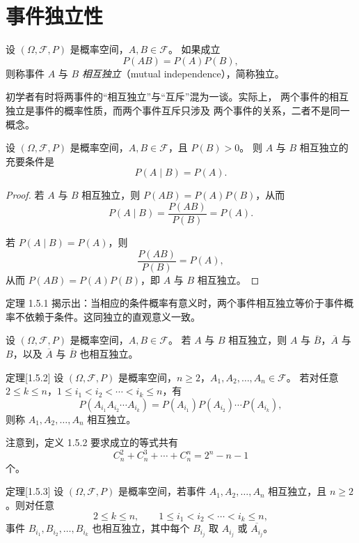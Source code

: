 \section{事件独立性}
\begin{definition}[独立的定义]
设 $(\Omega, \mathcal{F}, P)$ 是概率空间，$A,B \in \mathcal{F}$。
如果成立
\[
P(AB) = P(A) P(B),
\]
则称事件 $A$ 与 $B$ \emph{相互独立}（mutual independence），简称独立。

\medskip
初学者有时将两事件的“相互独立”与“互斥”混为一谈。实际上，
两个事件的相互独立是事件的概率性质，而两个事件互斥只涉及
两个事件的关系，二者不是同一概念。
\end{definition}
\begin{theorem}
设 $(\Omega, \mathcal{F}, P)$ 是概率空间，$A,B \in \mathcal{F}$，且 $P(B) > 0$。  
则 $A$ 与 $B$ 相互独立的充要条件是
\[
P(A \mid B) = P(A).
\]
\end{theorem}

\begin{proof}
若 $A$ 与 $B$ 相互独立，则 $P(AB) = P(A)P(B)$，从而
\[
P(A \mid B) = \frac{P(AB)}{P(B)} = P(A).
\]

若 $P(A \mid B) = P(A)$，则
\[
\frac{P(AB)}{P(B)} = P(A),
\]
从而 $P(AB) = P(A)P(B)$，即 $A$ 与 $B$ 相互独立。
\end{proof}

\noindent
定理 1.5.1 揭示出：当相应的条件概率有意义时，两个事件相互独立等价于事件概率不依赖于条件。这同独立的直观意义一致。
\begin{theorem}
设 $(\Omega, \mathcal{F}, P)$ 是概率空间，$A,B \in \mathcal{F}$。  
若 $A$ 与 $B$ 相互独立，则 $A$ 与 $\overline{B}$，$\overline{A}$ 与 $B$，以及 $\overline{A}$ 与 $\overline{B}$ 也相互独立。
\end{theorem}
\begin{definition}[独立事件同时发生概率就是他们概率直接乘]定理[1.5.2]
设 $(\Omega, \mathcal{F}, P)$ 是概率空间，$n \geq 2$，$A_1, A_2, \dots, A_n \in \mathcal{F}$。  
若对任意 $2 \leq k \leq n$，$1 \leq i_1 < i_2 < \cdots < i_k \leq n$，有
\[
P(A_{i_1} A_{i_2} \cdots A_{i_k}) = P(A_{i_1}) P(A_{i_2}) \cdots P(A_{i_k}),
\]
则称 $A_1, A_2, \dots, A_n$ 相互独立。

\medskip

注意到，定义 1.5.2 要求成立的等式共有
\[
C_n^2 + C_n^3 + \cdots + C_n^n = 2^n - n - 1
\]
个。
\end{definition}
\begin{theorem}定理[1.5.3]
设 $(\Omega,\mathcal{F},P)$ 是概率空间，若事件 $A_1,A_2,\dots,A_n$ 相互独立，且 $n\ge 2$。则对任意
\[
2\le k\le n,\qquad 1\le i_1<i_2<\cdots<i_k\le n,
\]
事件 $B_{i_1},B_{i_2},\dots,B_{i_k}$ 也相互独立，其中每个 $B_{i_j}$ 取 $A_{i_j}$ 或 $\overline{A_{i_j}}$。
\end{theorem}


